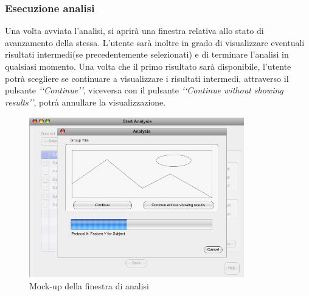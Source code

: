 \subsubsection{Esecuzione analisi}
Una volta avviata l'analisi, si aprirà una finestra relativa allo stato di avanzamento della stessa. L'utente sarà inoltre in grado di visualizzare eventuali risultati intermedi(se precedentemente selezionati) e di terminare l'analisi in qualsiasi momento.
Una volta che il primo risultato sarà disponibile, l'utente potrà scegliere se continuare a visualizzare i risultati intermedi, attraverso il pulsante \textit{\lq\lq Continue\rq\rq}, viceversa con il pulsante \textit{\lq\lq Continue without showing results\rq\rq}, potrà annullare la visualizzazione.
\begin{figure}[htp]
	\centering
	\includegraphics[width=0.8\linewidth,height=7cm]{./Content/Immagini/Prototype-v0.1/filesystemdoc_8_11}
	\caption{Mock-up della finestra di analisi}
	\label{running_analysis}
\end{figure}
\pagebreak

